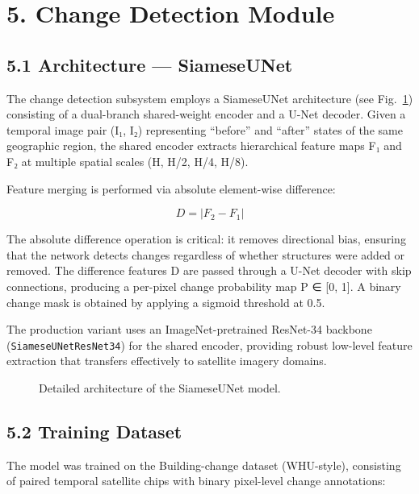 \documentclass[11pt,a4paper]{article}
\begin{document}
\hypertarget{change-detection-module}{%
\section{5. Change Detection Module}\label{change-detection-module}}

\hypertarget{architecture-siameseunet}{%
\subsection{5.1 Architecture --- SiameseUNet}\label{architecture-siameseunet}}

The change detection subsystem employs a SiameseUNet architecture (see Fig.~\ref{fig:siameseunet_arch}) consisting of a dual-branch shared-weight encoder and a U-Net decoder. Given a temporal image pair (I₁, I₂) representing ``before'' and ``after'' states of the same geographic region, the shared encoder extracts hierarchical feature maps F₁ and F₂ at multiple spatial scales (H, H/2, H/4, H/8).

Feature merging is performed via absolute element-wise difference:

\[D = |F_2 - F_1| \tag{1}\]

The absolute difference operation is critical: it removes directional bias, ensuring that the network detects changes regardless of whether structures were added or removed. The difference features D are passed through a U-Net decoder with skip connections, producing a per-pixel change probability map P ∈ {[}0, 1{]}. A binary change mask is obtained by applying a sigmoid threshold at 0.5.

The production variant uses an ImageNet-pretrained ResNet-34 backbone (\texttt{SiameseUNetResNet34}) for the shared encoder, providing robust low-level feature extraction that transfers effectively to satellite imagery domains.
 
\begin{figure}[htbp]
\centering
\resizebox{0.9\columnwidth}{!}{}
\caption{Detailed architecture of the SiameseUNet model.}
\label{fig:siameseunet_arch}
\end{figure}

\hypertarget{training-dataset}{%
\subsection{5.2 Training Dataset}\label{training-dataset}}

The model was trained on the Building-change dataset (WHU-style), consisting of paired temporal satellite chips with binary pixel-level change annotations:
\end{document}

